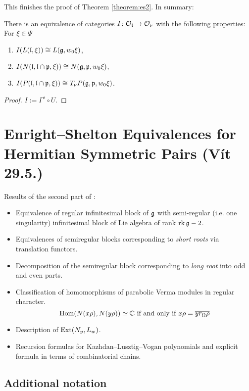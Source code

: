 \documentclass[a4paper,10pt]{article}
\begin{document}
This finishes the proof of Theorem \ref{theorem:es2}. In summary:
%
\begin{proposition}
There is an equivalence of categories $I \colon \mathcal{O}_{\mathfrak{l}} \to \mathcal{O}_\nu$ with the following properties: For $\xi \in \Psi$
%
\begin{enumerate}
\item $I(L(\mathfrak{l},\xi)) \cong L(\mathfrak{g},w_0\xi)$,
\item $I(N(\mathfrak{l,l\cap p},\xi)) \cong N(\mathfrak{g,p},w_0\xi)$,
\item $I(P(\mathfrak{l,l\cap p},\xi)) \cong T_\nu P(\mathfrak{g,p},w_0\xi)$.
\end{enumerate}
\end{proposition}
%
\begin{proof}
$I:=\Gamma^s \circ U$.
\end{proof}



\section{Enright--Shelton Equivalences for Hermitian Symmetric Pairs (Vít 29.5.)}

Results of the second part of \cite{es}:
\begin{itemize}
	\item Equivalence of regular infinitesimal block of $\mathfrak{g}$ with semi-regular (i.e. one singularity) infinitesimal block of Lie algebra of rank $\mathrm{rk}\, \mathfrak{g} -2$.
	\item Equivalences of semiregular blocks corresponding to \emph{short roots} via translation functors.
	\item Decomposition of the semiregular block corresponding to \emph{long root} into odd and even parts.
	\item Classification of homomorphisms of parabolic Verma modules in regular character. 
		\[
			\mathrm{Hom}(N(x\rho), N(y\rho)) \simeq \mathbb{C} \text { if and only if } x\rho = \overline{yr_\Omega\rho}
		\]
	\item Description of $\mathrm{Ext}(N_y, L_w)$.
	\item Recursion formulas for Kazhdan--Lusztig--Vogan polynomials and explicit formula in terms of combinatorial chains.
\end{itemize}

\subsection{Additional notation}
%
\end{document}
